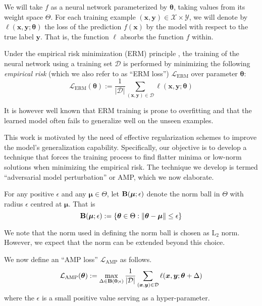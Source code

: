 \documentclass[final]{cvpr}
\begin{document}
We will take $f$ as a neural network parameterized by $\boldsymbol{\theta}$, taking values from its weight space $\Theta$. For each training example $(\boldsymbol{x},\boldsymbol{y})\in\mathcal{X}\times\mathcal{Y}$, we will denote by $\ell(\boldsymbol{x},\boldsymbol{y};\boldsymbol{\theta})$ the loss of the prediction $f(\boldsymbol{x})$ by the model with respect to the true label $\boldsymbol{y}$. That is, the function $\ell$ absorbs the function $f$ within.

Under the empirical risk minimization (ERM) principle \cite{vapnik1998statistical}, the training of the neural network using a training set $\mathcal{D}$ is performed by minimizing the following {\em empirical risk} (which we also refer to as ``ERM loss'') $\mathcal{L}_\mathrm{ERM}$ over parameter $\boldsymbol{\theta}$:
\begin{equation}
\mathcal{L}_\mathrm{ERM}(\boldsymbol{\theta}):=\frac{1}{|\mathcal{D}|}\sum_{(\boldsymbol{x},\boldsymbol{y})\in\mathcal{D}}\ell(\boldsymbol{x},\boldsymbol{y};\boldsymbol{\theta})
\end{equation}

It is however well known that ERM training is prone to overfitting \cite{vapnik1998statistical} and that the learned model often fails to generalize well on the unseen examples. 

This work is motivated by the need of effective regularization schemes to improve the model's generalization capability. Specifically, our objective is to develop a technique that forces the training process to find flatter minima or low-norm solutions when minimizing the empirical risk. The technique we develop is termed ``adversarial model perturbation'' or AMP, which we now elaborate. 

For any positive $\epsilon$ and any $\boldsymbol{\mu}\in\Theta$, let ${\rm\bf B}(\boldsymbol{\mu};\epsilon)$ denote the norm ball in $\Theta$ with radius $\epsilon$ centred at $\boldsymbol{\mu}$. That is
\begin{equation}
{\rm\bf B}(\boldsymbol{\mu};\epsilon):=\{\boldsymbol{\theta}\in\Theta:\Vert\boldsymbol{\theta}-\boldsymbol{\mu}\Vert\le\epsilon\}
\end{equation}

We note that the norm used in defining the norm ball
is chosen as $\text{L}_2$ norm. However, we expect that the norm can be extended beyond this choice.

We now define an ``AMP loss'' $\mathcal{L}_\mathrm{AMP}$ as follows.
\begin{equation}\label{eq:L_AMP}
\mathcal{L}_\mathrm{AMP}(\boldsymbol{\theta}):=\max_{\Delta\in{\rm\bf B}(\boldsymbol{0};\epsilon)}\frac{1}{|\mathcal{D}|}\sum_{(\boldsymbol{x},\boldsymbol{y})\in\mathcal{D}}\ell(\boldsymbol{x},\boldsymbol{y};\boldsymbol{\theta}+\Delta)
\end{equation}
where the $\epsilon$ is a small positive value serving as a hyper-parameter. 
\end{document}
